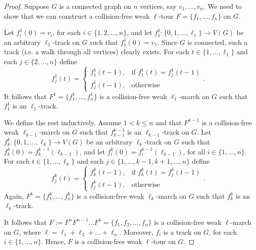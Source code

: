 \documentclass{article}
\begin{document}
\begin{proof}
   Suppose $G$ is a connected graph on $n$ vertices, say $v_1,\ldots,v_n$. We need to show that we can construct a collision-free weak $\ell$-tour $F=\{f_1,\ldots,f_n\}$ on $G$. 

   Let $f^1_i(0)=v_i$, for each $i\in\{1, 2, \ldots, n\}$, and let $f^1_1:\{0, 1, \ldots, \ell_1\}\rightarrow V(G)$ be an arbitrary $\ell_1$-track on $G$ such that $f^1_1(0)=v_1$. Since $G$ is connected, such a track (i.e. a walk through all vertices) clearly exists. For each $t\in\{1,\ldots,\ell_1\}$ and each $j\in\{2,\ldots,n\}$ define
   \[
    f^1_j(t) = \begin{cases}
                f^1_1(t-1), & \text{if } f^1_1(t) = f^1_j(t-1) \\
                f^1_j(t-1), & \text{otherwise}
             \end{cases}\text{.}
   \]
    It follows that $F^1=\{f^1_1, \ldots, f^1_n\}$ is a collision-free weak $\ell_1$-march on $G$ such that $f^1_1$ is an $\ell_1$-track.    

    We define the rest inductively. Assume $1<k\leq n$ and that $F^{k-1}$ is a collision-free weak $\ell_{k-1}$-march on $G$ such that $f^{k-1}_{k-1}$ is an $\ell_{k-1}$-track on $G$.
    Let $f^k_k:\{0, 1, \ldots, \ell_k\}\rightarrow V(G)$ be an arbitrary $\ell_k$-track on $G$ such that $f^k_k(0)=f^{k-1}_k(\ell_{k-1})$, and let $f^k_i(0)=f^{k-1}_i(\ell_{k-1})$, for all $i\in\{1,\ldots,n\}$. For each $t\in\{1,\ldots,\ell_k\}$ and each $j\in\{1,\ldots,k-1,k+1,\ldots,n\}$ define
   \[
    f^k_j(t) = \begin{cases}
                f^k_k(t-1), & \text{if } f^k_k(t) = f^k_j(t-1) \\
                f^k_j(t-1), & \text{otherwise}
             \end{cases}\text{.}
   \]
   Again, $F^k=\{f^k_1, \ldots, f^k_n\}$ is a collision-free weak $\ell_k$-march on $G$ such that $f^k_k$ is an $\ell_k$-track.

   It follows that $F:=F^n F^{n-1} \ldots F^1 = \{f_1, f_2, \ldots, f_n\}$ is a collision-free weak $\ell$-march on $G$, where $\ell=\ell_1+\ell_2+\ldots +\ell_n$. Moreover, $f_i$ is a track on $G$, for each $i\in \{1,\ldots,n\}$. Hence, $F$ is a collision-free weak $\ell$-tour on $G$.
\end{proof}
\end{document}
